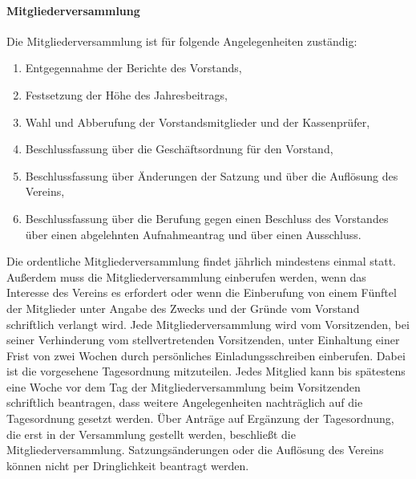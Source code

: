 \begin{multicols}{2}
\paragraph{Mitgliederversammlung}
Die Mitgliederversammlung ist für folgende Angelegenheiten zuständig:
\begin{enumerate}
\setlength{\itemsep}{-2pt}
\item Entgegennahme der Berichte des Vorstands,
\item Festsetzung der Höhe des Jahresbeitrags,
\item Wahl und Abberufung der Vorstandsmitglieder und der Kassenprüfer,
\item Beschlussfassung über die Geschäftsordnung für den Vorstand,
\item Beschlussfassung über Änderungen der Satzung und über die Auflösung
des Vereins,
\item Beschlussfassung über die Berufung gegen einen Beschluss des
Vorstandes über einen abgelehnten Aufnahmeantrag und über einen
Ausschluss.
\end{enumerate}
Die ordentliche Mitgliederversammlung findet jährlich mindestens einmal
statt. Außerdem muss die Mitgliederversammlung einberufen werden, wenn
das Interesse des Vereins es erfordert oder wenn die Einberufung von
einem Fünftel der Mitglieder unter Angabe des Zwecks und der Gründe
vom Vorstand schriftlich verlangt wird. Jede Mitgliederversammlung wird
vom Vorsitzenden, bei seiner Verhinderung vom stellvertretenden
Vorsitzenden, unter Einhaltung einer Frist von zwei Wochen durch
persönliches Einladungsschreiben einberufen. Dabei ist die vorgesehene
Tagesordnung mitzuteilen. Jedes Mitglied kann bis spätestens eine Woche
vor dem Tag der Mitgliederversammlung beim Vorsitzenden schriftlich
beantragen, dass weitere Angelegenheiten nachträglich auf die
Tagesordnung gesetzt werden. Über Anträge auf Ergänzung der
Tagesordnung, die erst in der Versammlung gestellt werden, beschließt die
Mitgliederversammlung. Satzungsänderungen oder die Auflösung des
Vereins können nicht per Dringlichkeit beantragt werden.


\end{multicols}
